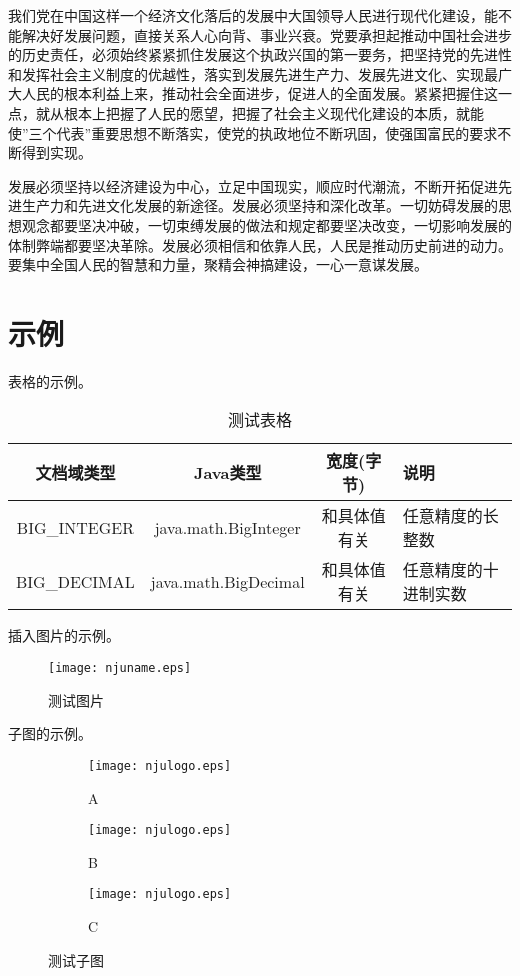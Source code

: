 \documentclass[adobefonts]{njuthesis}
\begin{document}
我们党在中国这样一个经济文化落后的发展中大国领导人民进行现代化建设，能不能解决好发展问题，直接关系人心向背、事业兴衰。党要承担起推动中国社会进步的历史责任，必须始终紧紧抓住发展这个执政兴国的第一要务，把坚持党的先进性和发挥社会主义制度的优越性，落实到发展先进生产力、发展先进文化、实现最广大人民的根本利益上来，推动社会全面进步，促进人的全面发展。紧紧把握住这一点，就从根本上把握了人民的愿望，把握了社会主义现代化建设的本质，就能使”三个代表”重要思想不断落实，使党的执政地位不断巩固，使强国富民的要求不断得到实现。 

发展必须坚持以经济建设为中心，立足中国现实，顺应时代潮流，不断开拓促进先进生产力和先进文化发展的新途径。发展必须坚持和深化改革。一切妨碍发展的思想观念都要坚决冲破，一切束缚发展的做法和规定都要坚决改变，一切影响发展的体制弊端都要坚决革除。发展必须相信和依靠人民，人民是推动历史前进的动力。要集中全国人民的智慧和力量，聚精会神搞建设，一心一意谋发展。 

\chapter{示例}

表格的示例。

\begin{table}[htbp]
  \centering
  \begin{tabular}{cccp{38mm}}
    \toprule
    \textbf{文档域类型} & \textbf{Java类型} & \textbf{宽度(字节)} & \textbf{说明} \\
    \midrule
    BIG\_INTEGER & java.math.BigInteger & 和具体值有关 & 任意精度的长整数 \\
    BIG\_DECIMAL & java.math.BigDecimal & 和具体值有关 & 任意精度的十进制实数 \\
    \bottomrule
  \end{tabular}
  \caption{测试表格}\label{table:test1}
\end{table}

插入图片的示例。

\begin{figure}[htbp]
   \centering
   \texttt{[image: njuname.eps]} %
   \caption{测试图片}
   \label{fig:example}
\end{figure}

子图的示例。

\begin{figure}[ht!]
    \centering
    \begin{subfigure}{.3\textwidth}
        \centering
        \texttt{[image: njulogo.eps]}
        \caption{A}
    \end{subfigure}
    \begin{subfigure}{.3\textwidth}
    	\centering
        \texttt{[image: njulogo.eps]}
        \caption{B}
    \end{subfigure}
    \begin{subfigure}{.3\textwidth}
    	\centering
        \texttt{[image: njulogo.eps]}
        \caption{C}
    \end{subfigure}
    \caption{测试子图}
\end{figure}
\end{document}

